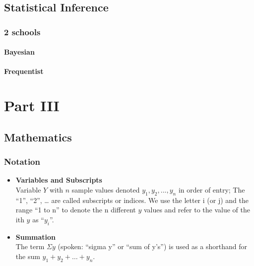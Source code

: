 \documentclass[]{book}
\begin{document}
\hypertarget{inference}{%
\chapter{Statistical Inference}\label{inference}}

\hypertarget{schools-1}{%
\section{2 schools}\label{schools-1}}

\hypertarget{bayesian-1}{%
\subsection{Bayesian}\label{bayesian-1}}

\hypertarget{frequentist-1}{%
\subsection{Frequentist}\label{frequentist-1}}

\hypertarget{part-part-iii-1}{%
\part{Part III}\label{part-part-iii-1}}

\hypertarget{math}{%
\chapter{Mathematics}\label{math}}

\hypertarget{notation-1}{%
\section{Notation}\label{notation-1}}

\begin{itemize}
\item
  \textbf{Variables and Subscripts}\\
  Variable \(Y\) with \(n\) sample values denoted \(y_1, y_2, ..., y_n\) in order of entry; The ``1'', ``2'', \ldots{} are called subscripts or indices. We use the letter i (or j) and the range ``1 to n'' to denote the n different \(y\) values and refer to the value of the ith \(y\) as ``\(y_i\)''.
\item
  \textbf{Summation}\\
  The term \(\Sigma y\) (spoken: ``sigma y'' or ``sum of y's'') is used as a shorthand for the sum \(y_1 + y_2 + \dots + y_n\).
\end{itemize}
\end{document}
